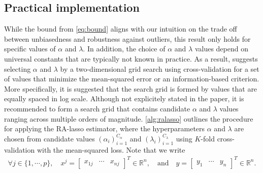 \subsection{Practical implementation}
While the bound from \cref{eq:bound} aligns with our intuition on the trade off between unbiasedness and robustness against outliers, this result only holds for specific values of $\alpha$ and $\lambda$. In addition, the choice of $\alpha$ and $\lambda$ values depend on universal constants that are typically not known in practice. As a result, \citet{fan2017estimation} suggests selecting $\alpha$ and $\lambda$ by a two-dimensional grid search using cross-validation for a set of values that minimize the mean-squared error or an information-based criterion. More specifically, it is suggested that the search grid is formed by values that are equally spaced in log scale. Although not explicitely stated in the paper, it is recommended to form a search grid that contains candidate $\alpha$ and $\lambda$ values ranging across multiple orders of magnitude. \cref{alg:ralasso} outlines the procedure for applying the RA-lasso estimator, where the hyperparameters $\alpha$ and $\lambda$ are chosen from candidate values $(\alpha_i)_{i=1}^{C_\alpha}$ and $(\lambda_i)_{i=1}^{C_\lambda}$ using $K$-fold cross-validation with the mean-squared loss. Note that we write
\begin{align*}
\forall j\in\{1,\cdots,p\}, \quad x^j = \begin{bmatrix} x_{1j} & \cdots & x_{nj} \end{bmatrix}^T \in \mathbb{R}^n, \quad\text{and}\quad
y = \begin{bmatrix} y_1 & \cdots & y_n \end{bmatrix}^T \in \mathbb{R}^n.
\end{align*}
